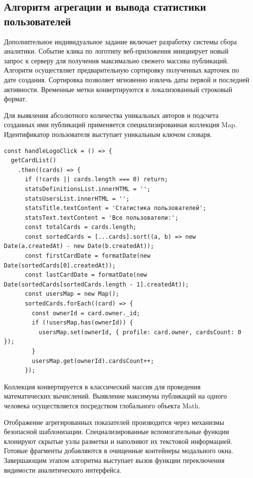 \documentclass[bachelor, och, pract, times]{SCWorks}
\begin{document}
\subsection{Алгоритм агрегации и вывода статистики пользователей}
Дополнительное индивидуальное задание включает разработку системы сбора
аналитики. Событие клика по логотипу веб-приложения инициирует новый запрос к
серверу для получения максимально свежего массива публикаций. Алгоритм
осуществляет предварительную сортировку полученных карточек по дате создания.
Сортировка позволяет мгновенно извлечь даты первой и последней активности.
Временные метки конвертируются в локализованный строковый формат.

Для выявления абсолютного количества уникальных авторов и подсчета созданных
ими публикаций применяется специализированная коллекция Map. Идентификатор
пользователя выступает уникальным ключом словаря.

\begin{verbatim}
const handleLogoClick = () => {
  getCardList()
    .then((cards) => {
      if (!cards || cards.length === 0) return;
      statsDefinitionsList.innerHTML = '';
      statsUsersList.innerHTML = '';
      statsTitle.textContent = 'Статистика пользователей';
      statsText.textContent = 'Все пользователи:';
      const totalCards = cards.length;
      const sortedCards = [...cards].sort((a, b) => new Date(a.createdAt) - new Date(b.createdAt));
      const firstCardDate = formatDate(new Date(sortedCards[0].createdAt));
      const lastCardDate = formatDate(new Date(sortedCards[sortedCards.length - 1].createdAt));
      const usersMap = new Map();
      sortedCards.forEach((card) => {
        const ownerId = card.owner._id;
        if (!usersMap.has(ownerId)) {
          usersMap.set(ownerId, { profile: card.owner, cardsCount: 0 });
        }
        usersMap.get(ownerId).cardsCount++;
      });
\end{verbatim}

Коллекция конвертируется в классический массив для проведения математических
вычислений. Выявление максимума публикаций на одного человека осуществляется
посредством глобального объекта Math.

Отображение агрегированных показателей производится через механизмы безопасной
шаблонизации. Специализированные вспомогательные функции клонируют скрытые узлы
разметки и наполняют их текстовой информацией. Готовые фрагменты добавляются в
очищенные контейнеры модального окна. Завершающим этапом алгоритма выступает
вызов функции переключения видимости аналитического интерфейса.
\end{document}
